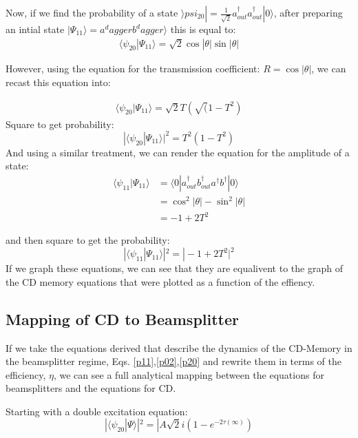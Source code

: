 \documentclass[12pt]{article}
\begin{document}
Now, if we find the probability of a state $\rangle psi_{20} | =\frac{1}{\sqrt{2}} a^\dagger_{out} a^\dagger_{out} | 0 \rangle$, after preparing an intial state $| \Psi_11 \rangle = a^dagger b^dagger \rangle $ this is equal to:
\begin{align}
\langle \psi_{20}|\Psi_{11} \rangle = \sqrt{2} \cos |\theta| \sin |\theta|
\end{align}

However, using the equation for the transmission coefficient: 
$R = \cos|\theta|$, we can recast this equation into:

\begin{align}
\langle \psi_{20}|\Psi_{11} \rangle = \sqrt{2}  T(\sqrt(1-T^2)
\end{align}
Square to get probability:
\begin{equation}
|\langle \psi_{20} | \Psi_{11} \rangle |^2 = T^2 (1-T^2) 
\end{equation}
And using a similar treatment, we can render the equation for the amplitude of a state:
\begin{align}
\langle \psi_{11} | \Psi_{11} \rangle &= \langle 0 | a^\dagger_{out}b^\dagger_{out} a^\dagger b^\dagger |0\rangle\\
&= \cos^2|\theta| - \sin^2|\theta|\\
&= -1+2T^2
\end{align}

and then square to get the probability:
\begin{equation}
|\langle \psi_{11} | \Psi_{11} \rangle |^2 = |-1+2T^2|^2 
\end{equation}
If we graph these equations, we can see that they are equalivent to the graph of the CD memory equations that were plotted as a function of the effiency.

\subsection{Mapping of CD to Beamsplitter}

If we take the equations derived that describe the dynamics of the CD-Memory in
the beamsplitter regime, Eqs. \eqref{p11},\eqref{p02},\eqref{p20}
and rewrite them in terms of the efficiency, $\eta$, we can see a full analytical
mapping between the equations for beamsplitters and the equations for CD.

Starting with a double excitation equation:
\begin{equation}
|\langle \psi_{20}| \Psi \rangle|^2=|A \sqrt{2} i(1- e^{-2\tau(\infty)})
\end{equation}
\end{document}
